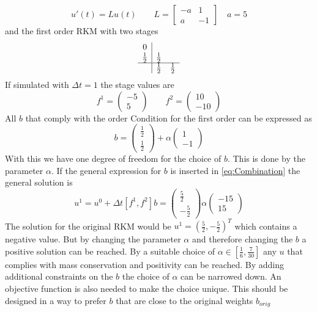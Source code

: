 \documentclass{article}
\begin{document}
\begin{equation}
u'(t) = L u(t) \qquad L = \left[\begin{matrix}- a & 1\\a & -1\end{matrix}\right] \quad a =5
\end{equation}
and the first order RKM with two stages
\begin{align}
\begin{array}{c|cc}
0 &  & \\
\frac{1}{2} & \frac{1}{2} & \\
\hline
 & \frac{1}{2} & \frac{1}{2}\\
\end{array}
\end{align}
If simulated with $\Delta t = 1$ the stage values are 
\begin{equation}
f^1 = \left(\begin{matrix}-5\\5\end{matrix}\right) \qquad f^2 = \left(\begin{matrix}10\\-10\end{matrix}\right)
\end{equation}
All $b$ that comply with the order Condition for the first order can be expressed as
\begin{equation}
b= \left(\begin{matrix}\frac{1}{2}\\ \frac{1}{2}\end{matrix}\right) + \alpha \left(\begin{matrix}1\\ -1\end{matrix}\right)
\end{equation}
With this we have one degree of freedom for the choice of $b$. This is done by the parameter $\alpha$.
If the general expression for $b$ is inserted in \eqref{eq:Combination} the general solution is 
\begin{equation}
u^{1} = u^0 + \Delta t  \left[f^1,f^2\right] b = \left(\begin{matrix}\frac{5}{2}\\- \frac{5}{2}\end{matrix}\right) \alpha  \left(\begin{matrix}-15\\15\end{matrix}\right)
\end{equation}
The solution for the original RKM would be $u^{1} = \left(\frac{5}{2} ,- \frac{5}{2}\right)^T$ which contains a negative value. But by changing the parameter $\alpha$ and therefore changing the $b$ a positive solution can be reached.
By a suitable choice of $\alpha \in \left[\frac{1}{6},\frac{7}{30}\right]$ any $u$ that complies with mass conservation and positivity can be reached. 
By adding additional constraints on the $b$ the choice of $\alpha$ can be narrowed down. 
An objective function is also needed to make the choice unique. This should be designed in a way to prefer $b$ that are close to the original weights $b_{orig}$
\end{document}
